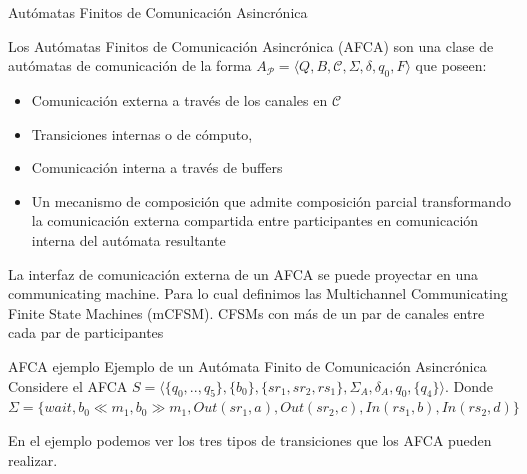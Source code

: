 \documentclass[10pt,xcolor={table,dvipsnames},t]{beamer}
\begin{document}
\begin{frame}{Autómatas Finitos de Comunicación Asincrónica}

Los Autómatas Finitos de Comunicación Asincrónica (AFCA) son una clase de autómatas de comunicación de la forma $A_\mathcal{P} = \langle Q, B, \mathcal{C}, \Sigma, \delta, q_0, F\rangle$ que poseen:
\begin{itemize}
    \item Comunicación externa a través de los canales en $\mathcal{C}$
    \item Transiciones internas o de cómputo,
    \item Comunicación interna a través de buffers
    \item Un mecanismo de composición que admite composición parcial transformando la comunicación externa compartida entre participantes en comunicación interna del autómata resultante
\end{itemize} 

La interfaz de comunicación externa de un AFCA se puede proyectar en una communicating machine. Para lo cual definimos las Multichannel Communicating Finite State Machines (mCFSM). CFSMs con más de un par de canales entre cada par de participantes
\end{frame}

\begin{frame}{AFCA ejemplo}
Ejemplo de un Autómata Finito de Comunicación Asincrónica
Considere el AFCA $S= \langle \{q_0,..,q_5\},\{b_0\},\{sr_1,sr_2,rs_1\}, \Sigma_A, \delta_A, q_0, \{q_4\} \rangle$. Donde $\Sigma =\{wait, b_0 \ll m_1,b_0 \gg m_1, Out(sr_1,a),Out(sr_2,c), In(rs_1,b),In(rs_2,d) \}$
\begin{center}
\end{center}
En el ejemplo podemos ver los tres tipos de transiciones que los AFCA pueden realizar. 
\end{frame}
\end{document}
